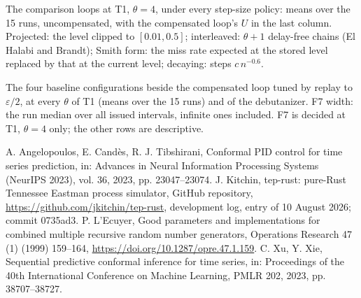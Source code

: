 \documentclass[10pt,a4paper]{article}
\newcommand{\figdir}{../../IPIS/docs/paper/figures/n1}
\begin{document}
\begin{table}[p]
\centering\footnotesize
\caption{The comparison loops at T1, $\theta = 4$, under every step-size policy: means over the 15
runs, uncompensated, with the compensated loop's $U$ in the last column. Projected: the level
clipped to $[0.01, 0.5]$; interleaved: $\theta + 1$ delay-free chains (El Halabi and Brandt);
Smith form: the miss rate expected at the stored level replaced by that at the current level;
decaying: steps $c\,n^{-0.6}$.}
\label{tab:loops}

\end{table}

\begin{table}[p]
\centering\footnotesize
\caption{The four baseline configurations beside the compensated loop tuned by replay to
$\varepsilon/2$, at every $\theta$ of T1 (means over the 15 runs) and of the debutanizer.
F7 width: the run median over all issued intervals, infinite ones included. F7 is decided at
T1, $\theta = 4$ only; the other rows are descriptive.}
\label{tab:baselines}

\end{table}

\clearpage
\begin{thebibliography}{9}
\setlength{\itemsep}{0pt}
 A. Angelopoulos, E. Cand\`es,
R. J. Tibshirani, Conformal PID control for time series prediction, in: Advances in Neural
Information Processing Systems (NeurIPS 2023), vol. 36, 2023, pp. 23047--23074.
 J. Kitchin, tep-rust: pure-Rust Tennessee Eastman process
simulator, GitHub repository, \url{https://github.com/jkitchin/tep-rust}, development log, entry
of 10 August 2026; commit 0735ad3.
 P. L'Ecuyer, Good parameters and implementations for
combined multiple recursive random number generators, Operations Research 47 (1) (1999)
159--164, \url{https://doi.org/10.1287/opre.47.1.159}.
 C. Xu, Y. Xie, Sequential predictive conformal inference
for time series, in: Proceedings of the 40th International Conference on Machine Learning, PMLR
202, 2023, pp. 38707--38727.
\end{thebibliography}
\end{document}
